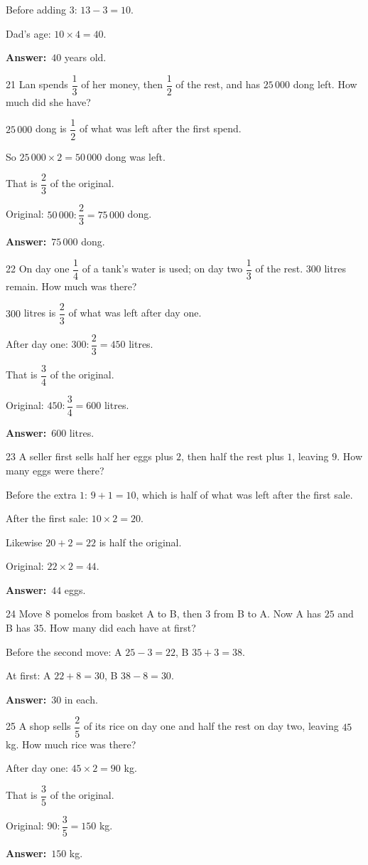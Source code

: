 \documentclass[11pt]{article}
\newif\ifsol \solfalse
\providecommand{\AnsWord}{Đáp số}
\newcommand{\dapso}[1]{\par\textbf{\AnsWord:}\ #1}
\newcommand{\probsol}[1]{%
  \begin{lrbox}{\solmeasure}\begin{minipage}{\dimexpr\linewidth-24pt\relax}#1\end{minipage}\end{lrbox}%
  \ifsol
    \begin{solbox}#1\end{solbox}%
  \else
    \setlength{\solht}{\dimexpr\ht\solmeasure+\dp\solmeasure+0.85cm\relax}%
    \ifdim\solht<1.35cm\setlength{\solht}{1.35cm}\fi
    \begin{tcolorbox}[colback=white,colframe=Line,boxrule=0.8pt,arc=5pt,
      left=8pt,right=8pt,top=4pt,bottom=4pt,height=\solht]{\footnotesize\color{Slate}\itshape\WorkWord}\end{tcolorbox}%
  \fi}
\newcommand{\gap}{\vspace{0.3cm}}
\def\WorkWord{Your work:}
\def\AnsWord{Answer}
\begin{document}
\probsol{
Before adding $3$: $13-3=10$.\par Dad's age: $10\times4=40$.
\dapso{$40$ years old.}}
\gap
\begin{probbox}{21}{\relax}
Lan spends $\dfrac13$ of her money, then $\dfrac12$ of the rest, and has $25\,000$ dong left. How much did she have?
\end{probbox}
\probsol{
$25\,000$ dong is $\dfrac12$ of what was left after the first spend.\par So $25\,000\times2=50\,000$ dong was left.\par That is $\dfrac23$ of the original.\par Original: $50\,000:\dfrac23=75\,000$ dong.
\dapso{$75\,000$ dong.}}
\gap
\begin{probbox}{22}{\relax}
On day one $\dfrac14$ of a tank's water is used; on day two $\dfrac13$ of the rest. $300$ litres remain. How much was there?
\end{probbox}
\probsol{
$300$ litres is $\dfrac23$ of what was left after day one.\par After day one: $300:\dfrac23=450$ litres.\par That is $\dfrac34$ of the original.\par Original: $450:\dfrac34=600$ litres.
\dapso{$600$ litres.}}
\gap
\begin{probbox}{23}{\relax}
A seller first sells half her eggs plus $2$, then half the rest plus $1$, leaving $9$. How many eggs were there?
\end{probbox}
\probsol{
Before the extra $1$: $9+1=10$, which is half of what was left after the first sale.\par After the first sale: $10\times2=20$.\par Likewise $20+2=22$ is half the original.\par Original: $22\times2=44$.
\dapso{$44$ eggs.}}
\gap
\begin{probbox}{24}{\relax}
Move $8$ pomelos from basket A to B, then $3$ from B to A. Now A has $25$ and B has $35$. How many did each have at first?
\end{probbox}
\probsol{
Before the second move: A $25-3=22$, B $35+3=38$.\par At first: A $22+8=30$, B $38-8=30$.
\dapso{$30$ in each.}}
\gap
\begin{probbox}{25}{\relax}
A shop sells $\dfrac25$ of its rice on day one and half the rest on day two, leaving $45$ kg. How much rice was there?
\end{probbox}
\probsol{
After day one: $45\times2=90$ kg.\par That is $\dfrac35$ of the original.\par Original: $90:\dfrac35=150$ kg.
\dapso{$150$ kg.}}
\end{document}
